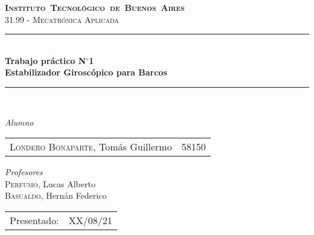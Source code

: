 \begin{titlepage}
\newcommand{\HRule}{\rule{\linewidth}{0.5mm}}
\center
\mbox{\textsc{\LARGE \bfseries {Instituto Tecnológico de Buenos Aires}}}\\[1.5cm]
\textsc{\Large 31.99 - Mecatrónica Aplicada}\\[0.5cm]


\HRule \\[0.6cm]
{ \Huge \bfseries Trabajo práctico N$^{\circ}$1}\\[0.4cm] 

\LARGE{ \bfseries Estabilizador Giroscópico para Barcos }

\HRule \\[1.5cm]

{\large

\emph{Alumno}\\
\vspace{3pt}

\begin{tabular}{lr} 	
\textsc{Londero Bonaparte}, Tomás Guillermo  & 58150 \\
\end{tabular}

\vspace{20pt}

\emph{Profesores}\\
\textsc{Perfumo}, Lucas Alberto\\
\textsc{Basualdo}, Hernán Federico\\



\vspace{3pt}

\vspace{100pt}

\begin{tabular}{ll}

Presentado: & XX/08/21\\

\end{tabular}

}

\vfill

\end{titlepage}
